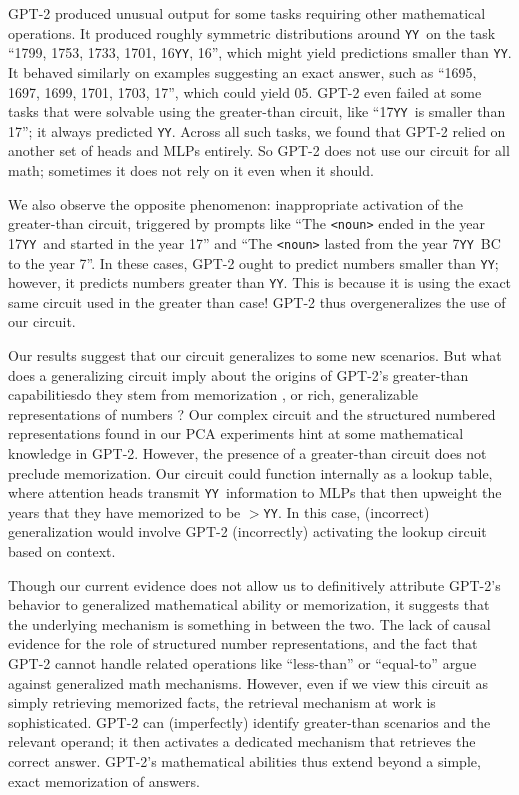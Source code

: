 \documentclass{article}
\newcommand{\YY}{\texttt{YY}}
\begin{document}
    GPT-2 produced unusual output for some tasks requiring other mathematical operations. It produced roughly symmetric distributions around \YY\ on the task ``1799, 1753, 1733, 1701, 16\YY, 16'', which might yield predictions smaller than \YY. It behaved similarly on examples suggesting an exact answer, such as ``1695, 1697, 1699, 1701, 1703, 17'', which could yield 05. GPT-2 even failed at some tasks that were solvable using the greater-than circuit, like ``17\YY\ is smaller than 17''; it always predicted \YY. Across all such tasks, we found that GPT-2 relied on another set of heads and MLPs entirely. So GPT-2 does not use our circuit for all math; sometimes it does not rely on it even when it should.

    We also observe the opposite phenomenon: inappropriate activation of the greater-than circuit, triggered by prompts like ``The \texttt{<noun>} ended in the year 17\YY\ and started in the year 17'' and ``The \texttt{<noun>} lasted from the year 7\YY\ BC to the year 7''. In these cases, GPT-2 ought to predict numbers smaller than \YY; however, it predicts numbers greater than \YY. This is because it is using the exact same circuit used in the greater than case! GPT-2 thus overgeneralizes the use of our circuit.
    
    Our results suggest that our circuit generalizes to some new scenarios. But what does a generalizing circuit imply about the origins of GPT-2's greater-than capabilities\textemdash do they stem from memorization \citep{tirumala2022memorization, carlini2023quantifying}, or rich, generalizable representations of numbers \citep{liu2022towards}? Our complex circuit and the structured numbered representations found in our PCA experiments hint at some mathematical knowledge in GPT-2. However, the presence of a greater-than circuit does not preclude memorization. Our circuit could function internally as a lookup table, where attention heads transmit \YY\ information to MLPs that then upweight the years that they have memorized to be $>$\YY. In this case, (incorrect) generalization would involve GPT-2 (incorrectly) activating the lookup circuit based on context.


    Though our current evidence does not allow us to definitively attribute GPT-2's behavior to generalized mathematical ability or memorization, it suggests that the underlying mechanism is something in between the two. The lack of causal evidence for the role of structured number representations, and the fact that GPT-2 cannot handle related operations like ``less-than'' or ``equal-to'' argue against generalized math mechanisms. However, even if we view this circuit as simply retrieving memorized facts, the retrieval mechanism at work is sophisticated. GPT-2 can (imperfectly) identify greater-than scenarios and the relevant operand; it then activates a dedicated mechanism that retrieves the correct answer. GPT-2's mathematical abilities thus extend beyond a simple, exact memorization of answers.
\end{document}
